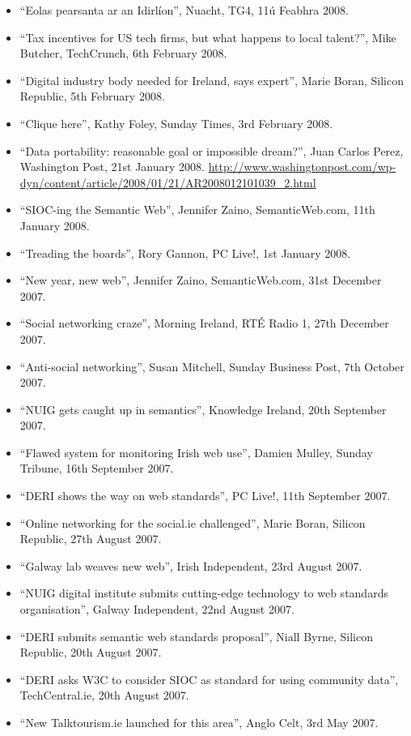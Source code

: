 \documentclass[10pt,a4paper]{res} %
\begin{document}
\begin{resume}
{\begin{itemize}
\item ``Eolas pearsanta ar an Idirl\'{i}on'', Nuacht, TG4, 11\'{u} Feabhra 2008.
\item ``Tax incentives for US tech firms, but what happens to local talent?'', Mike Butcher, TechCrunch, 6th February 2008.
\item ``Digital industry body needed for Ireland, says expert'', Marie Boran, Silicon Republic, 5th February 2008.
\item ``Clique here'', Kathy Foley, Sunday Times, 3rd February 2008.
\item ``Data portability: reasonable goal or impossible dream?'', Juan Carlos Perez, Washington Post, 21st January 2008. \url{http://www.washingtonpost.com/wp-dyn/content/article/2008/01/21/AR2008012101039_2.html}
\item ``SIOC-ing the Semantic Web'', Jennifer Zaino, SemanticWeb.com, 11th January 2008.
\item ``Treading the boards'', Rory Gannon, PC Live!, 1st January 2008.
\item ``New year, new web'', Jennifer Zaino, SemanticWeb.com, 31st December 2007.
\item ``Social networking craze'', Morning Ireland, RT\'{E} Radio 1, 27th December 2007.
\item ``Anti-social networking'', Susan Mitchell, Sunday Business Post, 7th October 2007.
\item ``NUIG gets caught up in semantics'', Knowledge Ireland, 20th September 2007.
\item ``Flawed system for monitoring Irish web use'', Damien Mulley, Sunday Tribune, 16th September 2007.
\item ``DERI shows the way on web standards'', PC Live!, 11th September 2007.
\item ``Online networking for the social.ie challenged'', Marie Boran, Silicon Republic, 27th August 2007.
\item ``Galway lab weaves new web'', Irish Independent, 23rd August 2007.
\item ``NUIG digital institute submits cutting-edge technology to web standards organisation'', Galway Independent, 22nd August 2007.
\item ``DERI submits semantic web standards proposal'', Niall Byrne, Silicon Republic, 20th August 2007.
\item ``DERI asks W3C to consider SIOC as standard for using community data'', TechCentral.ie, 20th August 2007.
\item ``New Talktourism.ie launched for this area'', Anglo Celt, 3rd May 2007.

\end{itemize}}
\end{resume}
\end{document}
